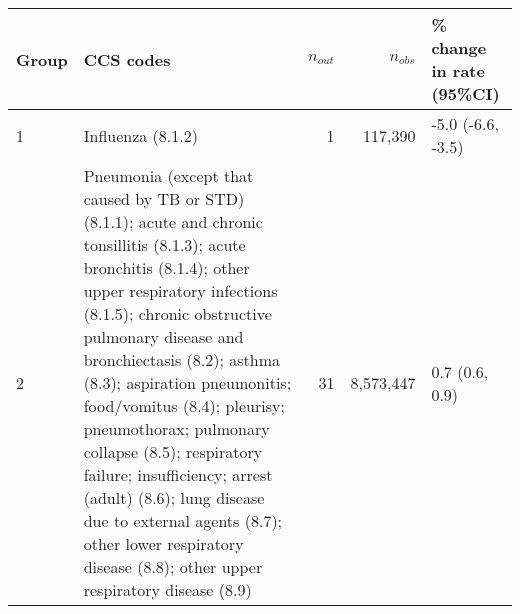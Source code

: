\begin{tabular}{lp{6.5cm}rrp{2.2cm}}
  \hline
Group & CCS codes & $n_{out}$ & $n_{obs}$ & \% change in rate (95\%CI) \\ 
  \hline
 1 & Influenza (8.1.2) &  1 & 117,390 & -5.0 (-6.6, -3.5) \\ 
   2 & Pneumonia (except that caused by TB or STD) (8.1.1); acute and chronic tonsillitis (8.1.3); acute bronchitis (8.1.4); other upper respiratory infections (8.1.5); chronic obstructive pulmonary disease and bronchiectasis (8.2); asthma (8.3); aspiration pneumonitis; food/vomitus (8.4); pleurisy; pneumothorax; pulmonary collapse (8.5); respiratory failure; insufficiency; arrest (adult) (8.6); lung disease due to external agents (8.7); other lower respiratory disease (8.8); other upper respiratory disease (8.9) & 31 & 8,573,447 & 0.7 (0.6, 0.9) \\ 
   \hline
\end{tabular}

